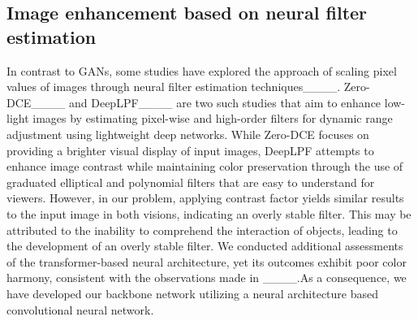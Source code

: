 \subsection{Image enhancement based on neural filter estimation}
In contrast to GANs, some studies have explored the approach of scaling pixel values of images through neural filter estimation techniques____. Zero-DCE____ and DeepLPF____ are two such studies that aim to enhance low-light images by estimating pixel-wise and high-order filters for dynamic range adjustment using lightweight deep networks. While Zero-DCE focuses on providing a brighter visual display of input images, DeepLPF attempts to enhance image contrast while maintaining color preservation through the use of graduated elliptical and polynomial filters that are easy to understand for viewers. However, in our problem, applying contrast factor yields similar results to the input image in both visions, indicating an overly stable filter. This may be attributed to the inability to comprehend the interaction of objects, leading to the development of an overly stable filter. We conducted additional assessments of the transformer-based neural architecture, yet its outcomes exhibit poor color harmony, consistent with the observations made in ____.As a consequence, we have developed our backbone network utilizing a neural architecture based convolutional neural network.